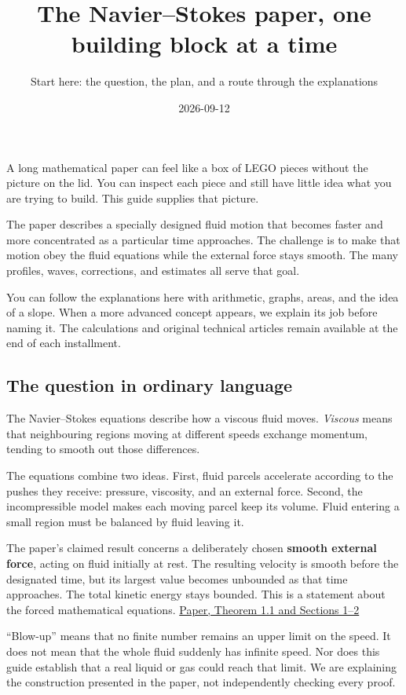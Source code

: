 \documentclass[
  english,
  11pt,
]{article}
\title{The Navier--Stokes paper, one building block at a time}
\subtitle{Start here: the question, the plan, and a route through the
explanations}
\author{}
\date{2026-09-12}
\begin{document}
\maketitle


A long mathematical paper can feel like a box of LEGO pieces without the
picture on the lid. You can inspect each piece and still have little
idea what you are trying to build. This guide supplies that picture.

The paper describes a specially designed fluid motion that becomes
faster and more concentrated as a particular time approaches. The
challenge is to make that motion obey the fluid equations while the
external force stays smooth. The many profiles, waves, corrections, and
estimates all serve that goal.

You can follow the explanations here with arithmetic, graphs, areas, and
the idea of a slope. When a more advanced concept appears, we explain
its job before naming it. The calculations and original technical
articles remain available at the end of each installment.

\subsection{The question in ordinary
language}\label{the-question-in-ordinary-language}

The Navier--Stokes equations describe how a viscous fluid moves.
\emph{Viscous} means that neighbouring regions moving at different
speeds exchange momentum, tending to smooth out those differences.

The equations combine two ideas. First, fluid parcels accelerate
according to the pushes they receive: pressure, viscosity, and an
external force. Second, the incompressible model makes each moving
parcel keep its volume. Fluid entering a small region must be balanced
by fluid leaving it.

The paper's claimed result concerns a deliberately chosen \textbf{smooth
external force}, acting on fluid initially at rest. The resulting
velocity is smooth before the designated time, but its largest value
becomes unbounded as that time approaches. The total kinetic energy
stays bounded. This is a statement about the forced mathematical
equations.
\href{https://cdn.openai.com/pdf/32d9f210-8b73-45e0-91bc-82a30aef8a9a/navier-stokes.pdf}{Paper,
Theorem 1.1 and Sections 1--2}

``Blow-up'' means that no finite number remains an upper limit on the
speed. It does not mean that the whole fluid suddenly has infinite
speed. Nor does this guide establish that a real liquid or gas could
reach that limit. We are explaining the construction presented in the
paper, not independently checking every proof.
\end{document}
